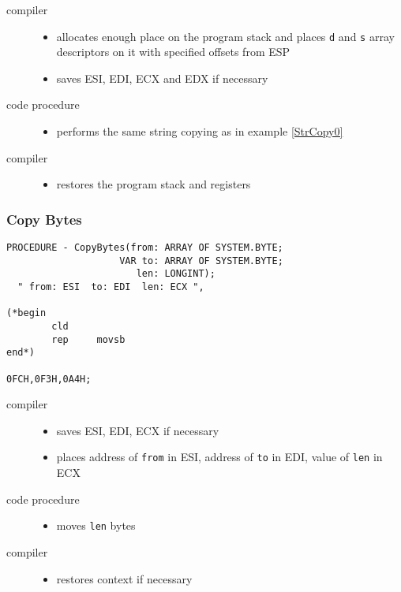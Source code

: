 \begin{description}
\item[compiler] \mbox{}
   \begin{itemize}
     \item  allocates enough place on the program stack
            and places {\tt d} and {\tt s}
            array descriptors on it with specified offsets from ESP
     \item saves ESI, EDI, ECX and EDX if necessary
   \end{itemize}
\item[code procedure] \mbox{}
   \begin{itemize}
   \item performs the same string copying as in example \ref{StrCopy0}
   \end{itemize}
\item[compiler] \mbox{}
   \begin{itemize}
   \item restores the program stack and registers
   \end{itemize}
\end{description}

\subsubsection{Copy Bytes}

\begin{verbatim}
PROCEDURE - CopyBytes(from: ARRAY OF SYSTEM.BYTE;
                    VAR to: ARRAY OF SYSTEM.BYTE;
                       len: LONGINT);
  " from: ESI  to: EDI  len: ECX ",

(*begin
        cld
        rep     movsb
end*)

0FCH,0F3H,0A4H;
\end{verbatim}

\begin{description}
\item[compiler] \mbox{}
   \begin{itemize}
     \item saves ESI, EDI, ECX if necessary
     \item places address of {\tt from} in ESI,
           address of {\tt to} in EDI,
           value of {\tt len} in ECX
   \end{itemize}
\item[code procedure] \mbox{}
   \begin{itemize}
   \item  moves {\tt len} bytes
   \end{itemize}
\item[compiler] \mbox{}
   \begin{itemize}
   \item  restores context if necessary
   \end{itemize}
\end{description}

